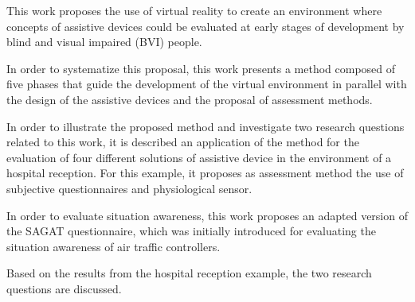 



This work proposes the use of virtual reality to create an environment where concepts of assistive devices could be evaluated at early stages of development by blind and visual impaired (BVI) people.

In order to systematize this proposal, this work presents a method composed of five phases that guide the development of the virtual environment in parallel with the design of the assistive devices and the proposal of assessment methods.

In order to illustrate the proposed method and investigate two research questions related to this work, it is described an application of the method for the evaluation of four different solutions of assistive device in the environment of a hospital reception. For this example, it proposes as assessment method the use of subjective questionnaires and physiological sensor. 

In order to evaluate situation awareness, this work proposes an adapted version of the SAGAT questionnaire, which was initially introduced for evaluating the situation awareness of air traffic controllers. 

Based on the results from the hospital reception example, the two research questions are discussed.




